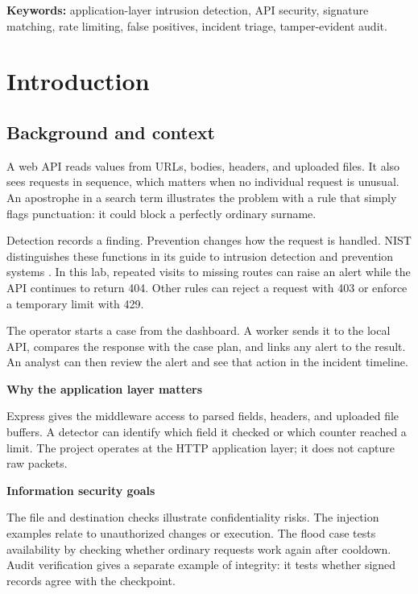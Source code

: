 \documentclass[11pt,a4paper,oneside]{report}
\newcommand{\topic}[1]{\par\addvspace{4pt}\noindent\textbf{#1}\par\nobreak\vspace{-.20em}}
\begin{document}
\textbf{Keywords:} application-layer intrusion detection, API security, signature matching, rate limiting, false positives, incident triage, tamper-evident audit.

\tableofcontents
\clearpage
\pagestyle{sentinel}
\setlength{\extrarowheight}{2pt}
\captionsetup[table]{skip=6pt,position=above}

\chapter{Introduction}
\section{Background and context}
A web API reads values from URLs, bodies, headers, and uploaded files. It also sees requests in sequence, which matters when no individual request is unusual. An apostrophe in a search term illustrates the problem with a rule that simply flags punctuation: it could block a perfectly ordinary surname.

Detection records a finding. Prevention changes how the request is handled. NIST distinguishes these functions in its guide to intrusion detection and prevention systems \cite{nist}. In this lab, repeated visits to missing routes can raise an alert while the API continues to return 404. Other rules can reject a request with 403 or enforce a temporary limit with 429.

The operator starts a case from the dashboard. A worker sends it to the local API, compares the response with the case plan, and links any alert to the result. An analyst can then review the alert and see that action in the incident timeline.

\topic{Why the application layer matters}
Express gives the middleware access to parsed fields, headers, and uploaded file buffers. A detector can identify which field it checked or which counter reached a limit. The project operates at the HTTP application layer; it does not capture raw packets.

\topic{Information security goals}
The file and destination checks illustrate confidentiality risks. The injection examples relate to unauthorized changes or execution. The flood case tests availability by checking whether ordinary requests work again after cooldown. Audit verification gives a separate example of integrity: it tests whether signed records agree with the checkpoint.
\end{document}
